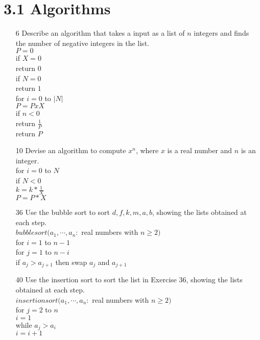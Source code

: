 \documentclass[a4paper]{article}
\newcommand\tab[1][0.5cm]{\hspace*{#1}}
\begin{document}
  \section*{3.1 Algorithms}
  \begin{itemize}
    \item[6] Describe an algorithm that takes a input as a list of $n$ integers and finds the number of negative integers in the list. \\
    \tab $P = 0$ \\
    \tab if $X = 0$ \\
    \tab\tab return $0$ \\
    \tab if $N = 0$ \\
    \tab\tab return $1$ \\
    \tab for $i = 0$ to $|N|$ \\
    \tab\tab $P = P x X$ \\
    \tab\tab if $n < 0$ \\
    \tab\tab\tab return $\frac{1}{P}$ \\
    \tab\tab return $P$
    \item[10] Devise an algorithm to compute $x^n$, where $x$ is a real number and $n$ is an integer. \\
    \tab for $i = 0$ to $N$ \\
    \tab\tab if $N < 0$ \\
    \tab\tab\tab $k = k * \frac{1}{X}$ \\
    \tab\tab $P = P * X$
    \item[36] Use the bubble sort to sort $d, f, k, m, a, b$, showing the lists obtained at each step. \\
    \tab $bubblesort(a_1, \cdots, a_n:$ real numbers with $n \geq 2)$ \\
    \tab\tab for $i = 1$ to $n - 1$ \\
    \tab\tab\tab for $j = 1$ to $n - i$ \\
    \tab\tab\tab\tab if $a_j > a_{j + 1}$ then swap $a_j$ and $a_{j + 1}$ 
    \item[40] Use the insertion sort to sort the list in Exercise $36$, showing the lists obtained at each step. \\
    \tab $insertionsort(a_1, \cdots, a_n:$ real numbers with $n \geq 2)$ \\
    \tab\tab for $j = 2$ to $n$ \\
    \tab\tab\tab $i = 1$ \\
    \tab\tab\tab while $a_j > a_i$ \\
    \tab\tab\tab\tab $i = i + 1$ \\

\end{itemize}
\end{document}
